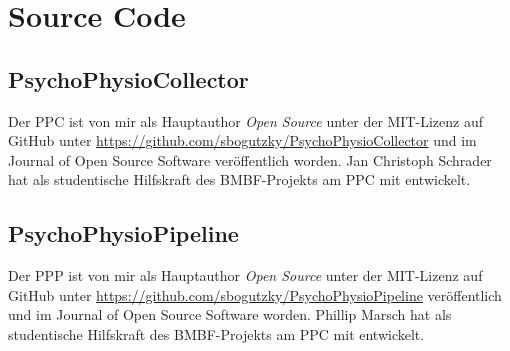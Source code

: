 \chapter{Source Code}
\section{PsychoPhysioCollector}
Der \ac{PPC} ist von mir als Hauptauthor \emph{Open Source} unter der MIT-Lizenz auf GitHub unter \url{https://github.com/sbogutzky/PsychoPhysioCollector} und im Journal of Open Source Software \citep{Bogutzky2016} veröffentlich worden. Jan Christoph Schrader hat als studentische Hilfskraft des \acs{BMBF}-Projekts am \ac{PPC} mit entwickelt. 

\section{PsychoPhysioPipeline}
Der \ac{PPP} ist von mir als Hauptauthor \emph{Open Source} unter der MIT-Lizenz auf GitHub unter \url{https://github.com/sbogutzky/PsychoPhysioPipeline} veröffentlich und im Journal of Open Source Software \citep{Bogutzky2016a} worden. Phillip Marsch hat als studentische Hilfskraft des \acs{BMBF}-Projekts am \ac{PPC} mit entwickelt. 